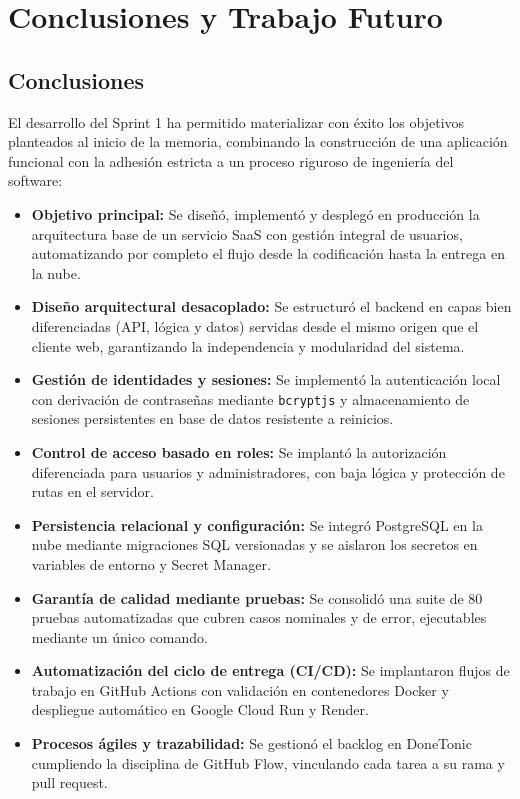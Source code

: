 \chapter{Conclusiones y Trabajo Futuro}
\label{cap:conclusiones}

\section{Conclusiones}

El desarrollo del Sprint 1 ha permitido materializar con éxito los objetivos planteados al inicio de la memoria, combinando la construcción de una aplicación funcional con la adhesión estricta a un proceso riguroso de ingeniería del software:
\begin{itemize}
    \item \textbf{Objetivo principal:} Se diseñó, implementó y desplegó en producción la arquitectura base de un servicio SaaS con gestión integral de usuarios, automatizando por completo el flujo desde la codificación hasta la entrega en la nube.
    \item \textbf{Diseño arquitectural desacoplado:} Se estructuró el backend en capas bien diferenciadas (API, lógica y datos) servidas desde el mismo origen que el cliente web, garantizando la independencia y modularidad del sistema.
    \item \textbf{Gestión de identidades y sesiones:} Se implementó la autenticación local con derivación de contraseñas mediante \texttt{bcryptjs} y almacenamiento de sesiones persistentes en base de datos resistente a reinicios.
    \item \textbf{Control de acceso basado en roles:} Se implantó la autorización diferenciada para usuarios y administradores, con baja lógica y protección de rutas en el servidor.
    \item \textbf{Persistencia relacional y configuración:} Se integró PostgreSQL en la nube mediante migraciones SQL versionadas y se aislaron los secretos en variables de entorno y Secret Manager.
    \item \textbf{Garantía de calidad mediante pruebas:} Se consolidó una suite de 80 pruebas automatizadas que cubren casos nominales y de error, ejecutables mediante un único comando.
    \item \textbf{Automatización del ciclo de entrega (CI/CD):} Se implantaron flujos de trabajo en GitHub Actions con validación en contenedores Docker y despliegue automático en Google Cloud Run y Render.
    \item \textbf{Procesos ágiles y trazabilidad:} Se gestionó el backlog en DoneTonic cumpliendo la disciplina de GitHub Flow, vinculando cada tarea a su rama y pull request.
\end{itemize}

